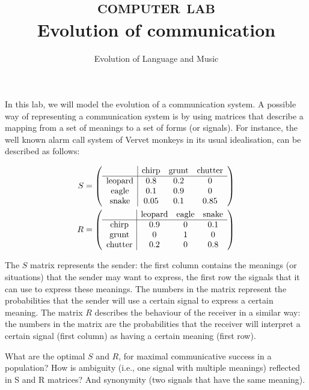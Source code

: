 \documentclass[a4paper, 9pt]{article}
\title{\textsc{computer lab}\\ \textbf{Evolution of communication}}
\author{Evolution of Language and Music}
\begin{document}
\maketitle


\noindent
In this lab, we will model the evolution of a
communication system. A possible way of representing a communication
system is by using matrices that describe a mapping from a set of
meanings to a set of forms (or signals). For instance, the well known
alarm call system of Vervet monkeys \cite{seyfarth1980monkey} in its
usual idealisation, can be described as follows:

\begin{align*}\footnotesize
S &=
  \left(
  \begin{array}{c|ccc}
  & \text{chirp} & \text{grunt} & \text{chutter}\\
  \hline
  \text{leopard} & 0.8 & 0.2 & 0\\
  \text{eagle} & 0.1 & 0.9 & 0\\
  \text{snake} & 0.05 & 0.1 & 0.85 \\
  \end{array}
  \right)
  \\
R &=
  \left(
  \begin{array}{c|ccc}
  & \text{leopard} & \text{eagle} & \text{snake}\\
  \hline
  \text{chirp} & 0.9 & 0 & 0.1\\
  \text{grunt} & 0 & 1 & 0\\
  \text{chutter} & 0.2 & 0 & 0.8\\
  \end{array}
  \right)
\end{align*}

The $S$ matrix represents the sender: the first column contains the
meanings (or situations) that the sender may want to express, the first
row the signals that it can use to express these meanings. The numbers
in the matrix represent the probabilities that the sender will use a
certain signal to express a certain meaning. The matrix $R$ describes
the behaviour of the receiver in a similar way: the numbers in the
matrix are the probabilities that the receiver will interpret a certain
signal (first column) as having a certain meaning (first row).

\begin{exercise}
\askstar What are the optimal $S$ and $R$, for maximal communicative success in a population?
\askstar How is ambiguity (i.e., one signal with multiple meanings) reflected in S and R matrices? And synonymity (two signals that have the same meaning).
\end{exercise}
\end{document}
